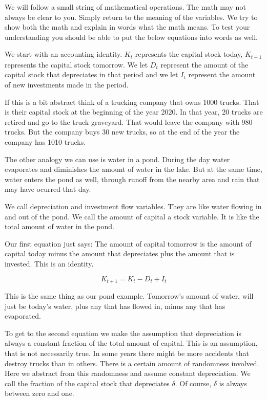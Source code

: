 \documentclass[
]{book}
\begin{document}
We will follow a small string of mathematical operations. The math may not always be clear to you. Simply return to the meaning of the variables. We try to show both the math and explain in words what the math means. To test your understanding you should be able to put the below equations into words as well.

We start with an accounting identity. \(K_t\) represents the capital stock today, \(K_{t+1}\) represents the capital stock tomorrow. We let \(D_t\) represent the amount of the capital stock that depreciates in that period and we let \(I_t\) represent the amount of new investments made in the period.

If this is a bit abstract think of a trucking company that owns 1000 trucks. That is their capital stock at the beginning of the year 2020. In that year, 20 trucks are retired and go to the truck graveyard. That would leave the company with 980 trucks. But the company buys 30 new trucks, so at the end of the year the company has 1010 trucks.

The other analogy we can use is water in a pond. During the day water evaporates and diminishes the amount of water in the lake. But at the same time, water enters the pond as well, through runoff from the nearby area and rain that may have ocurred that day.

We call depreciation and investment flow variables. They are like water flowing in and out of the pond. We call the amount of capital a stock variable. It is like the total amount of water in the pond.

Our first equation just says: The amount of capital tomorrow is the amount of capital today minus the amount that depreciates plus the amount that is invested. This is an identity.

\[K_{t+1}=K_t-D_t+I_t\]

This is the same thing as our pond example. Tomorrow's amount of water, will just be today's water, plus any that has flowed in, minus any that has evaporated.

To get to the second equation we make the assumption that depreciation is always a constant fraction of the total amount of capital. This is an assumption, that is not necessarily true. In some years there might be more accidents that destroy trucks than in others. There is a certain amount of randomness involved. Here we abstract from this randomness and assume constant depreciation. We call the fraction of the capital stock that depreciates \(\delta\). Of course, \(\delta\) is always between zero and one.
\end{document}
